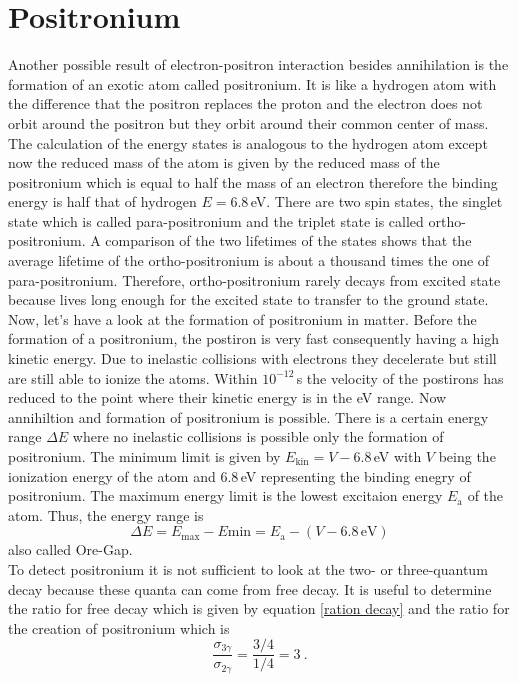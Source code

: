 \section{Positronium}
Another possible result of electron-positron interaction besides annihilation is the formation of an exotic atom called positronium. It is like a hydrogen atom with the difference that the positron replaces the proton and the electron does not orbit around the positron but they orbit around their common center of mass. The calculation of the energy states is analogous to the hydrogen atom except now the reduced mass of the atom is given by the reduced mass of the positronium which is equal to half the mass of an electron therefore the binding energy is half that of hydrogen $E=6.8\,$eV. There are two spin states, the singlet state which is called para-positronium and the triplet state is called ortho-positronium. A comparison of the two lifetimes of the states shows that the average lifetime of the ortho-positronium is about a thousand times the one of para-positronium. Therefore, ortho-positronium rarely decays from excited state because lives long enough for the excited state to transfer to the ground state.
Now, let's have a look at the formation of positronium in matter. Before the formation of a positronium, the postiron is very fast consequently having a high kinetic energy. Due to inelastic collisions with electrons they decelerate but still are still able to ionize the atoms. Within $10^{-12}\,$s the velocity of the postirons has reduced to the point where their kinetic energy is in the eV range. Now annihiltion and formation of positronium is possible. There is a certain energy range $\Delta E$ where no inelastic collisions is possible only the formation of positronium. The minimum limit is given by $E_\text{kin}=V-6.8\,$eV with $V$ being the ionization energy of the atom and $6.8\,$eV representing the binding enegry of positronium. The maximum energy limit is the lowest excitaion energy $E_\text{a}$ of the atom. Thus, the energy range is $$\Delta E=E_\text{max}-E\text{min}=E_\text{a}-(V-6.8\,\text{eV})$$ also called Ore-Gap.\\
To detect positronium it is not sufficient to look at the two- or three-quantum decay because these quanta can come from free decay. It is useful to determine the ratio for free decay which is given by equation \ref{ration decay} and the ratio for the creation of positronium which is 
\begin{equation}
    \frac{\sigma_{3\gamma}}{\sigma_{2\gamma}}=\frac{3/4}{1/4}=3 ~.
    \label{ratio formation}
\end{equation}
